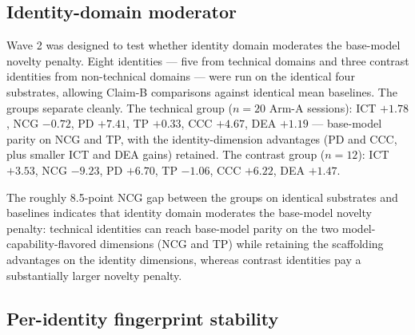 \documentclass[11pt]{article}
\begin{document}
\subsection{Identity-domain moderator}
\label{sec:results-moderator}

Wave 2 was designed to test whether identity domain moderates the base-model novelty penalty. Eight identities --- five from technical domains and three contrast identities from non-technical domains --- were run on the identical four substrates, allowing Claim-B comparisons against identical mean baselines. The groups separate cleanly. The technical group ($n = 20$ Arm-A sessions): ICT $+1.78$, NCG $-0.72$, PD $+7.41$, TP $+0.33$, CCC $+4.67$, DEA $+1.19$ --- base-model parity on NCG and TP, with the identity-dimension advantages (PD and CCC, plus smaller ICT and DEA gains) retained. The contrast group ($n = 12$): ICT $+3.53$, NCG $-9.23$, PD $+6.70$, TP $-1.06$, CCC $+6.22$, DEA $+1.47$.

The roughly 8.5-point NCG gap between the groups on identical substrates and baselines indicates that identity domain moderates the base-model novelty penalty: technical identities can reach base-model parity on the two model-capability-flavored dimensions (NCG and TP) while retaining the scaffolding advantages on the identity dimensions, whereas contrast identities pay a substantially larger novelty penalty.

\subsection{Per-identity fingerprint stability}
\label{sec:results-stability}
\end{document}

